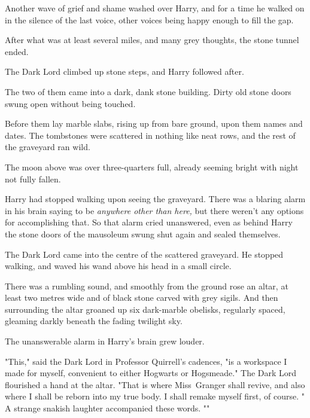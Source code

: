 Another wave of grief and shame washed over Harry, and for a time he walked on
in the silence of the last voice, other voices being happy enough to fill the
gap.

After what was at least several miles, and many grey thoughts, the stone tunnel
ended.

The Dark Lord climbed up stone steps, and Harry followed after.

The two of them came into a dark, dank stone building. Dirty old stone doors
swung open without being touched.

Before them lay marble slabs, rising up from bare ground, upon them names and
dates. The tombstones were scattered in nothing like neat rows, and the rest of
the graveyard ran wild.

The moon above was over three-quarters full, already seeming bright with night
not fully fallen.

Harry had stopped walking upon seeing the graveyard. There was a blaring alarm
in his brain saying to be \emph{anywhere other than here,} but there weren't
any options for accomplishing that. So that alarm cried unanswered, even as
behind Harry the stone doors of the mausoleum swung shut again and sealed
themselves.

The Dark Lord came into the centre of the scattered graveyard. He stopped
walking, and waved his wand above his head in a small circle.

There was a rumbling sound, and smoothly from the ground rose an altar, at
least two metres wide and of black stone carved with grey sigils. And then
surrounding the altar groaned up six dark-marble obelisks, regularly spaced,
gleaming darkly beneath the fading twilight sky.

The unanswerable alarm in Harry's brain grew louder.

"This," said the Dark Lord in Professor Quirrell's cadences, "is a workspace I
made for myself, convenient to either Hogwarts or Hogsmeade." The Dark Lord
flourished a hand at the altar. "That is where Miss~Granger shall revive, and
also where I shall be reborn into my true body. I shall remake myself first, of
course. " A strange
snakish laughter accompanied these words. ""

